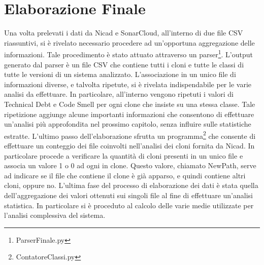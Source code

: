 \section{Elaborazione Finale}
Una volta prelevati i dati da Nicad e SonarCloud, all'interno di due file CSV riassuntivi, si è rivelato necessario procedere ad un'opportuna aggregazione delle informazioni. Tale procedimento è stato attuato attraverso un parser\footnote{ParserFinale.py}. L'output generato dal parser è un file CSV che contiene tutti i cloni e tutte le classi di tutte le versioni di un sistema analizzato. L'associazione in un unico file di informazioni diverse, e talvolta ripetute, si è rivelata indispendabile per le varie analisi da effettuare. In particolare, all'interno vengono ripetuti i valori di Technical Debt e Code Smell per ogni clone che insiste su una stessa classe. Tale ripetizione aggiunge alcune importanti informazioni che consentono di effettuare un'analisi più approfondita nel prossimo capitolo, senza influire sulle statistiche estratte.
L'ultimo passo dell'elaborazione sfrutta un programma\footnote{ContatoreClassi.py} che consente di effettuare un conteggio dei file coinvolti nell'analisi dei cloni fornita da Nicad. In particolare procede a verificare la quantità di cloni presenti in un unico file e associa un valore 1 o 0 ad ogni in clone. Questo valore, chiamato NewPath, serve ad indicare se il file che contiene il clone è già apparso, e quindi contiene altri cloni, oppure no.
L'ultima fase del processo di elaborazione dei dati è stata quella dell'aggregazione dei valori ottenuti sui singoli file al fine di effettuare un'analisi statistica. In particolare si è proceduto al calcolo delle varie medie utilizzate per l'analisi complessiva del sistema.
